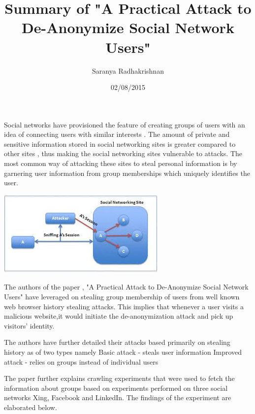 \documentclass{article}
\title{Summary of  "A Practical Attack to De-Anonymize Social Network Users"}
\author{Saranya Radhakrishnan}
\date{02/08/2015}
\begin{document}
\maketitle
\justify

Social networks have provisioned the feature of creating  groups of users with an idea of  connecting users with similar interests . The amount of private and sensitive information stored in social networking sites is greater compared to other sites , thus making the social networking sites vulnerable to attacks. The most common way of attacking these sites to steal personal information is by garnering user information from group memberships which uniquely identifies the user. 

\begin{center}
\includegraphics{AttackInGraphicalFormat}
\end{center}


The authors of the paper , "A Practical Attack to De-Anonymize Social Network Users"  have leveraged on stealing group membership of users from well known web browser history stealing attacks. This implies that whenever a user visits a malicious website,it would initiate the de-anonymization attack and pick up visitors’ identity.


The authors have further detailed their attacks based primarily on stealing history as of two types namely
 Basic attack - steals user information
 Improved attack - relies on groups instead of individual users


The paper further explains crawling experiments that were used to fetch the information about 
groups based on experiments performed on three social networks Xing, Facebook and LinkedIn. The findings of the experiment are elaborated below.
\end{document}
